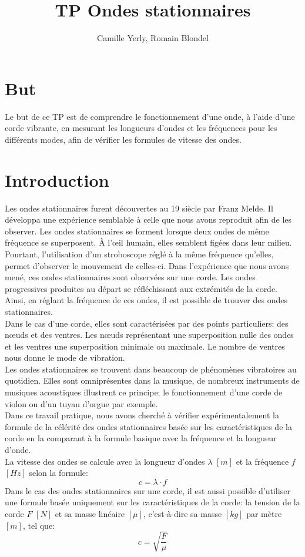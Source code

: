 \documentclass[11pt]{article}
\title{\textbf{TP Ondes stationnaires}}
\author{Camille Yerly, Romain Blondel}
\affil{2M8, Gymnase Auguste Piccard}
\begin{document}
    \maketitle

    \section{But}\label{sec:but}

    Le but de ce TP est de comprendre le fonctionnement d'une onde, à l'aide d'une corde vibrante, en mesurant
    les longueurs d'ondes et les fréquences pour les différents modes, afin de vérifier les formules de vitesse
    des ondes.

    \section{Introduction}\label{sec:introduction}

    Les ondes stationnaires furent découvertes au 19 siècle par Franz Melde.
    Il développa une expérience semblable à celle que nous avons reproduit afin de les observer.
    Les ondes stationnaires se forment lorsque deux ondes de même fréquence se superposent.
    À l'œil humain, elles semblent figées dans leur milieu.
    Pourtant, l'utilisation d'un stroboscope réglé à la même fréquence qu'elles, permet d'observer le
    mouvement de celles-ci.
    Dans l'expérience que nous avons mené, ces ondes stationnaires sont observées sur une corde.
    Les ondes progressives produites au départ se réfléchissant aux extrémités de la corde.
    Ainsi, en réglant la fréquence de ces ondes, il est possible de trouver des ondes stationnaires.\\
    Dans le cas d'une corde, elles sont caractérisées par des points particuliers: des nœuds et des ventres.
    Les nœuds représentant une superposition nulle des ondes et les ventres une superposition minimale ou
    maximale.
    Le nombre de ventres nous donne le mode de vibration.\\
    Les ondes stationnaires se trouvent dans beaucoup de phénomènes vibratoires au quotidien.
    Elles sont omniprésentes dans la musique, de nombreux instruments de musiques acoustiques illustrent
    ce principe; le fonctionnement d'une corde de violon ou d'un tuyau d'orgue par exemple.\\
    Dans ce travail pratique, nous avons cherché à vérifier expérimentalement la formule de la célérité
    des ondes stationnaires basée sur les caractéristiques de la corde en la comparant à la formule basique
    avec la fréquence et la longueur d'onde.\\
    La vitesse des ondes se calcule avec la longueur d'ondes $\lambda$ $[m]$ et la fréquence $f$ $[Hz]$
    selon la formule:
    \[c=\lambda \cdot f\]
    Dans le cas des ondes stationnaires sur une corde, il est aussi possible d'utiliser une formule basée
    uniquement sur les caractéristiques de la corde: la tension de la corde $F$ $[N]$ et sa masse linéaire
    $[\mu]$, c'est-à-dire sa masse $[kg]$ par mètre $[m]$, tel que:
    \[c=\sqrt{\dfrac{F}{\mu}}\]
\end{document}
